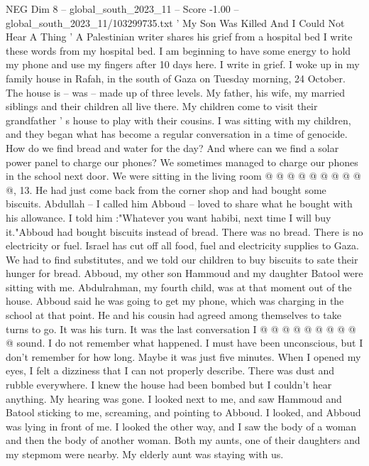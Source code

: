 \begin{textsample}{NEG Dim 8 – global\_south\_2023\_11 – Score -1.00 – global\_south\_2023\_11/103299735.txt}  \label{ex:f8_neg_182}
' My Son Was Killed And I Could Not Hear A Thing ' A Palestinian writer shares his grief from a hospital bed I write these words from my hospital bed.
I am beginning to have some energy to hold my phone and use my fingers after 10 days here.
I write in grief.
I woke up in my family house in Rafah, in the south of Gaza on Tuesday morning, 24 October.
The house is -- was -- made up of three levels.
My father, his wife, my married siblings and their children all live there.
My children come to visit their grandfather ' s house to play with their cousins.
I was sitting with my children, and they began what has become a regular conversation in a time of genocide.
How do we find bread and water for the day?
And where can we find a solar power panel to charge our phones?
We sometimes managed to charge our phones in the school next door.
We were sitting in the living room @ @ @ @ @ @ @ @ @ @, 13.
He had just come back from the corner shop and had bought some biscuits.
Abdullah -- I called him Abboud -- loved to share what he bought with his allowance.
I told him :"Whatever you want habibi, next time I will buy it."Abboud had bought biscuits instead of bread.
There was no bread.
There is no electricity or fuel.
Israel has cut off all food, fuel and electricity supplies to Gaza.
We had to find substitutes, and we told our children to buy biscuits to sate their hunger for bread.
Abboud, my other son Hammoud and my daughter Batool were sitting with me.
Abdulrahman, my fourth child, was at that moment out of the house.
Abboud said he was going to get my phone, which was charging in the school at that point.
He and his cousin had agreed among themselves to take turns to go.
It was his turn.
It was the last conversation I @ @ @ @ @ @ @ @ @ @ sound.
I do not remember what happened.
I must have been unconscious, but I don't remember for how long.
Maybe it was just five minutes.
When I opened my eyes, I felt a dizziness that I can not properly describe.
There was dust and rubble everywhere.
I knew the house had been bombed but I couldn't hear anything.
My hearing was gone.
I looked next to me, and saw Hammoud and Batool sticking to me, screaming, and pointing to Abboud.
I looked, and Abboud was lying in front of me.
I looked the other way, and I saw the body of a woman and then the body of another woman.
Both my aunts, one of their daughters and my stepmom were nearby.
My elderly aunt was staying with us.

\end{textsample}
